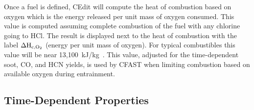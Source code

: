 {{Once a fuel is defined, CEdit will compute the heat of combustion based on oxygen which is the energy released per unit mass of oxygen consumed. This value is computed assuming complete combustion of the fuel with any chlorine going to HCl. The result is displayed next to the heat of combustion with the label $\Delta \rm{H}_{\rm{c} , \rm{O}_2}$ (energy per unit mass of oxygen). For typical combustibles this value will be near 13,100~\unit{kJ/kg}~\cite{Huggett:1980}. This value, adjusted for the time-dependent soot, CO, and HCN yields, is used by CFAST when limiting combustion based on available oxygen during entrainment.

\subsection{Time-Dependent Properties}
\label{info:FIRE2}

}}
